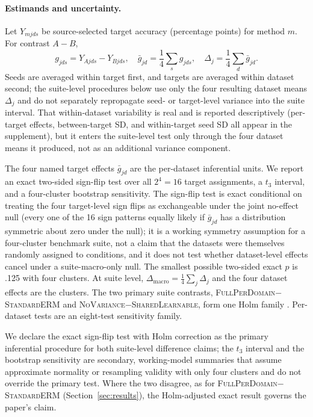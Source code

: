 \documentclass[10pt]{article}
\newcommand{\full}{\textsc{FullPerDomain}}
\newcommand{\erm}{\textsc{StandardERM}}
\newcommand{\shared}{\textsc{SharedLearnable}}
\newcommand{\novar}{\textsc{NoVariance}}
\begin{document}
\paragraph{Estimands and uncertainty.}
Let $Y_{mjds}$ be source-selected target accuracy (percentage points) for
method $m$. For contrast $A-B$,
\begin{equation}
g_{jds}=Y_{Ajds}-Y_{Bjds},\quad
\bar g_{jd}=\frac{1}{4}\sum_s g_{jds},\quad
\Delta_j=\frac{1}{4}\sum_d\bar g_{jd}.
\end{equation}
Seeds are averaged within target first, and targets are averaged within
dataset second; the suite-level procedures below use only the four resulting
dataset means $\Delta_j$ and do not separately repropagate seed- or
target-level variance into the suite interval. That within-dataset
variability is real and is reported descriptively (per-target effects,
between-target SD, and within-target seed SD all appear in the supplement),
but it enters the suite-level test only through the four dataset means it
produced, not as an additional variance component.

The four named target effects $\bar g_{jd}$ are the per-dataset inferential
units. We report an exact two-sided sign-flip test over all $2^4=16$ target
assignments, a $t_3$ interval, and a four-cluster bootstrap sensitivity. The
sign-flip test is exact conditional on treating the four target-level sign
flips as exchangeable under the joint no-effect null (every one of the 16
sign patterns equally likely if $\bar g_{jd}$ has a distribution symmetric
about zero under the null); it is a working symmetry assumption for a
four-cluster benchmark suite, not a claim that the datasets were themselves
randomly assigned to conditions, and it does not test whether dataset-level
effects cancel under a suite-macro-only null. The smallest possible two-sided
exact $p$ is .125 with four clusters. At suite level,
$\Delta_{\mathrm{macro}}=\frac14\sum_j\Delta_j$ and the four dataset effects
are the clusters. The two primary suite contrasts, \full{}$-$\erm{} and
\novar{}$-$\shared{}, form one Holm family \citep{holm1979simple}. Per-dataset
tests are an eight-test sensitivity family.

We declare the exact sign-flip test with Holm correction as the primary
inferential procedure for both suite-level difference claims; the $t_3$
interval and the bootstrap sensitivity are secondary, working-model summaries
that assume approximate normality or resampling validity with only four
clusters and do not override the primary test. Where the two disagree, as for
\full{}$-$\erm{} (Section~\ref{sec:results}), the Holm-adjusted exact result
governs the paper's claim.
\end{document}
